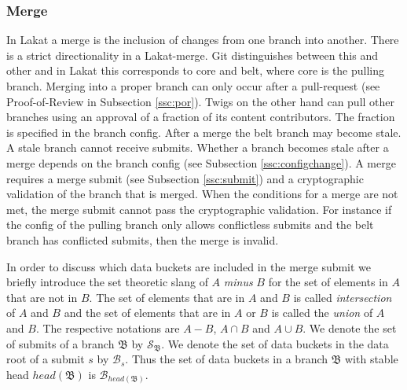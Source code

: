 \subsubsection*{Merge}
In Lakat a merge is the inclusion of changes from one branch into another. There is a strict directionality in a Lakat-merge. Git distinguishes between this and other and in Lakat this corresponds to core and belt, where core is the pulling branch. Merging into a proper branch can only occur after a pull-request (see Proof-of-Review in Subsection \ref{ssc:por}). Twigs on the other hand can pull other branches using an approval of a fraction of its content contributors. The fraction is specified in the branch config. After a merge the belt branch may become stale. A stale branch cannot receive submits. Whether a branch becomes stale after a merge depends on the branch config (see Subsection \ref{ssc:configchange}).
A merge requires a merge submit (see Subsection \ref{ssc:submit}) and a cryptographic validation of the branch that is merged. When the conditions for a merge are not met, the merge submit cannot pass the cryptographic validation. For instance if the config of the pulling branch only allows conflictless submits and the belt branch has conflicted submits, then the merge is invalid.

In order to discuss which data buckets are included in the merge submit we briefly introduce the set theoretic slang of $A$ \textit{minus} $B$ for the set of elements in $A$ that are not in $B$. The set of elements that are in $A$ and $B$ is called \textit{intersection} of $A$ and $B$ and the set of elements that are in $A$ or $B$ is called the \textit{union} of $A$ and $B$. The respective notations are $A-B$, $A\cap B$ and $A\cup B$. We denote the set of submits of a branch $\mathfrak B$ by $\mathcal S_{\mathfrak B}$. We denote the set of data buckets in the data root of a submit $s$ by $\mathcal{B}_s$. Thus the set of data buckets in a branch $\mathfrak B$ with stable head $head(\mathfrak B)$ is $\mathcal{B}_{head(\mathfrak B)}$. 

